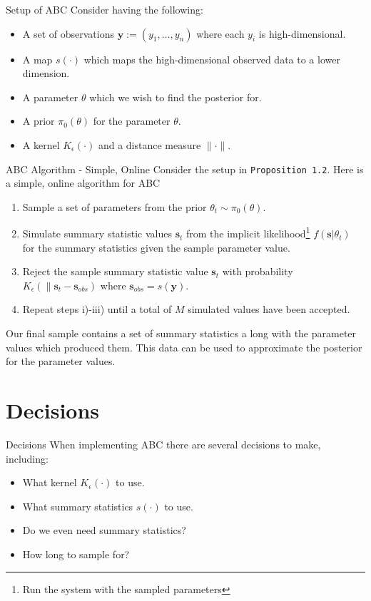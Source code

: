 \documentclass[11pt,a4paper]{article}
\begin{document}
\begin{proposition}{Setup of ABC}
  Consider having the following:
  \begin{itemize}
    \item A set of observations $\mathbf{y}:=(y_1,\dots,y_n)$ where each $y_i$ is high-dimensional.
    \item A map $s(\cdot)$ which maps the high-dimensional observed data to a lower dimension.
    \item A parameter $\theta$ which we wish to find the posterior for.
    \item A prior $\pi_0(\theta)$ for the parameter $\theta$.
    \item A kernel $K_\epsilon(\cdot)$ and a distance measure $\|\cdot\|$.
  \end{itemize}
\end{proposition}

\begin{proposition}{ABC Algorithm - Simple, Online}
  Consider the setup in \texttt{Proposition 1.2}. Here is a simple, online algorithm for ABC
  \begin{enumerate}
    \item Sample a set of parameters from the prior $\theta_t\sim\pi_0(\theta)$.
    \item Simulate summary statistic values $\mathbf{s}_t$ from the implicit likelihood\footnote{Run the system with the sampled parameters} $f(\mathbf{s}|\theta_t)$ for the summary statistics given the sample parameter value.
    \item Reject the sample summary statistic value $\mathbf{s}_t$ with probability $K_\epsilon(\|\mathbf{s}_t-\mathbf{s}_{obs})$ where ${\mathbf{s}_{obs}=s(\mathbf{y})}$.
    \item Repeat steps i)-iii) until a total of $M$ simulated values have been accepted.
  \end{enumerate}
  Our final sample contains a set of summary statistics a long with the parameter values which produced them. This data can be used to approximate the posterior for the parameter values.
\end{proposition}

\section*{Decisions}

\begin{remark}{Decisions}
  When implementing ABC there are several decisions to make, including:
  \begin{itemize}
    \item What kernel $K_\epsilon(\cdot)$ to use.
    \item What summary statistics $s(\cdot)$ to use.
    \item Do we even need summary statistics?
    \item How long to sample for?
  \end{itemize}
\end{remark}
\end{document}
